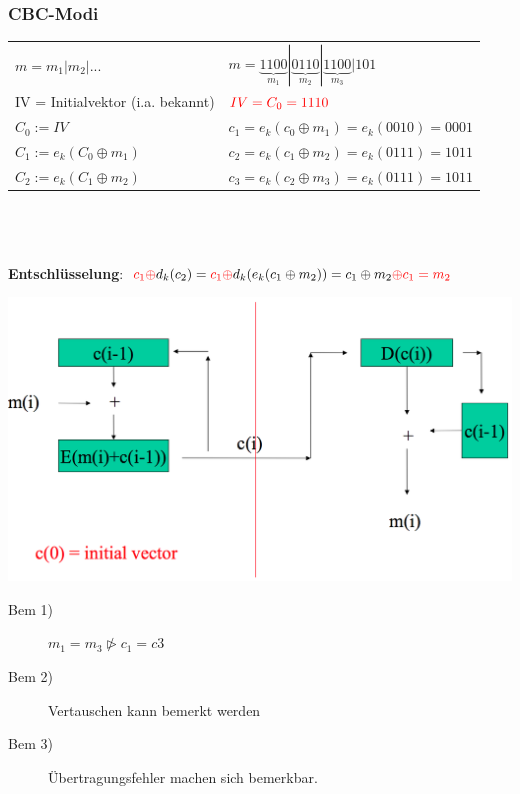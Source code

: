 \documentclass[10pt]{article}
\begin{document}
\subsubsection{CBC-Modi}
\begin{tabular}{p{7.5cm}  l}
	$m= m_1 | m_2 | ...$ & $m=\underbrace{1100}_{m_1} | \underbrace{0110}_{m_2} | \underbrace{1100}_{m_3} | 101$ \\
	{\color{red}IV = Initialvektor} (i.a. bekannt) &  $\color{red}IV=C_0=1110$  \\
	$C_0 := IV$ & $c_1 = e_k(c_0 \oplus m_1) = e_k(0010) = 0001$ \\
	$C_1 := e_k(C_0 \oplus m_1)$ & $c_2 = e_k(c_1 \oplus m_2) = e_k(0111) = 1011$ \\
	$C_2 := e_k(C_1 \oplus m_2)$  & $c_3 = e_k(c_2 \oplus m_3) = e_k(0111) = 1011$ \\
\end{tabular} \\ \\ \\
\textbf{Entschlüsselung}: ${\color{red}c_1\oplus} d_k(c_2)={\color{red}c_1\oplus}d_k(e_k(c_1\oplus m_2))= c_1\oplus m_2 {\color{red}\oplus c_1 = m_2}$
\begin{center}
	\includegraphics[scale=0.2]{cbc-encryption.png}
\end{center}
\begin{description}
	\item[Bem 1)] $m_1=m_3 \ntriangleright c_1=c3$
	\item[Bem 2)] Vertauschen kann bemerkt werden 
	\item[Bem 3)] Übertragungsfehler machen sich bemerkbar.
\end{description}
\end{document}
